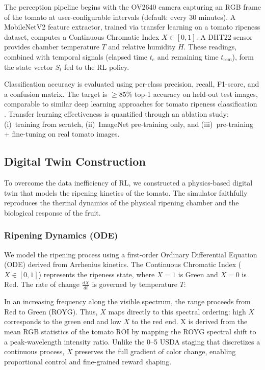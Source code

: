 The perception pipeline begins with the OV2640 camera capturing an RGB frame of the tomato at user-configurable intervals (default: every 30 minutes). A MobileNetV2 feature extractor, trained via transfer learning on a tomato ripeness dataset, computes a Continuous Chromatic Index $X \in [0, 1]$. A DHT22 sensor provides chamber temperature $T$ and relative humidity $H$. These readings, combined with temporal signals (elapsed time $t_e$ and remaining time $t_{\text{rem}}$), form the state vector $S_t$ fed to the RL policy.

Classification accuracy is evaluated using per-class precision, recall, F1-score, and a confusion matrix. The target is $\geq$85\% top-1 accuracy on held-out test images, comparable to similar deep learning approaches for tomato ripeness classification \cite{zhang2021tomato, phan2023tomato}. Transfer learning effectiveness is quantified through an ablation study: (i)~training from scratch, (ii)~ImageNet pre-training only, and (iii)~pre-training + fine-tuning on real tomato images.

\subsection{Digital Twin Construction}
To overcome the data inefficiency of RL, we constructed a physics-based digital twin that models the ripening kinetics of the tomato. The simulator faithfully reproduces the thermal dynamics of the physical ripening chamber and the biological response of the fruit.

\subsubsection{Ripening Dynamics (ODE)}
We model the ripening process using a first-order Ordinary Differential Equation (ODE) derived from Arrhenius kinetics. The Continuous Chromatic Index ($X \in [0, 1]$) represents the ripeness state, where $X=1$ is Green and $X=0$ is Red. The rate of change $\frac{dX}{dt}$ is governed by temperature $T$:

    \noindent In an increasing frequency along the visible spectrum, the range proceeds from Red to Green (ROYG). Thus, $X$ maps directly to this spectral ordering: high $X$ corresponds to the green end and low $X$ to the red end.  X is derived from the mean RGB statistics of the tomato ROI by mapping the ROYG spectral shift to a peak-wavelength intensity ratio.  Unlike the 0--5 USDA staging \cite{usda1991} that discretizes a continuous process, $X$ preserves the full gradient of color change, enabling proportional control and fine-grained reward shaping.

